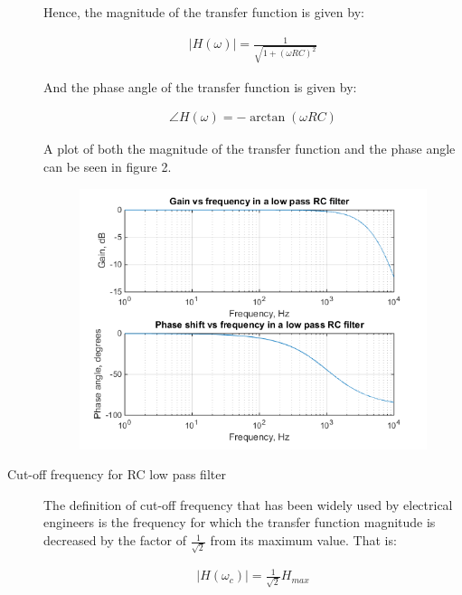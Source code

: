 \documentclass{article}
\begin{document}
\begin{description}
Hence, the magnitude of the transfer function is given by:

\begin{align}
	|H(\omega)| = \frac{1}{\sqrt{1 + (\omega R C)^2}}
\end{align}

And the phase angle of the transfer function is given by:

\begin{align}
	\angle H(\omega) = - \arctan (\omega RC)
\end{align}

A plot of both the magnitude of the transfer function and the phase angle can be seen in figure 2.

\begin{center}
	\begin{figure}[H]
		\begin{minipage}{0.6\textwidth}
			\includegraphics[scale=0.8]{bode1}
		\end{minipage}
	\end{figure}
\end{center}

\item[Cut-off frequency for RC low pass filter]
The definition of cut-off frequency that has been widely used by electrical engineers is the frequency for which the transfer function magnitude is decreased by the factor of $\frac{1}{\sqrt{2}}$ from its maximum value. That is:

\begin{align*}
	|H(\omega_c)| = \frac{1}{\sqrt{2}}H_{max}
\end{align*}


\end{description}
\end{document}
